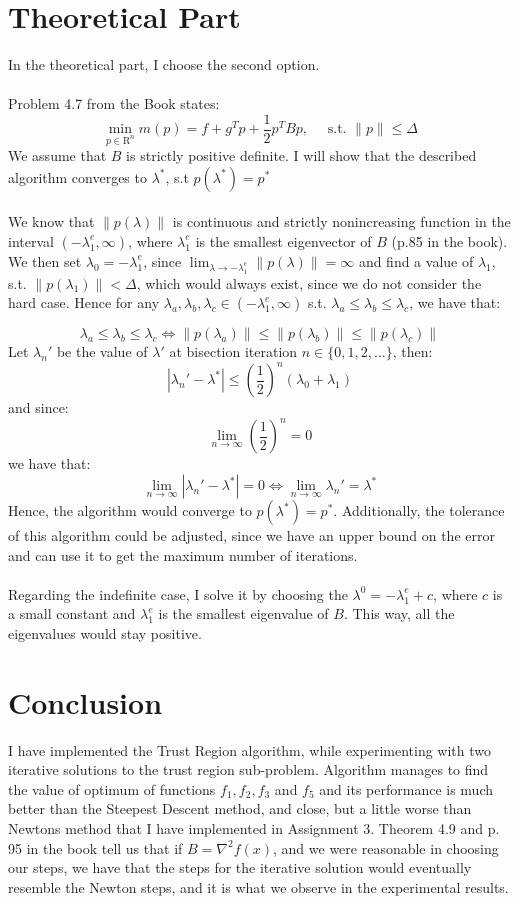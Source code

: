 \documentclass[a4paper]{article}
\begin{document}
\section{Theoretical Part}
\label{sec:theory}
In the theoretical part, I choose the second option. \\\\
Problem 4.7 from the Book states:
\[
\min _{p \in \mathrm{R}^{n}} m(p)=f+g^{T} p+\frac{1}{2} p^{T} B p, \quad \text { s.t. }\|p\| \leq \Delta
\]
We assume that $B$ is strictly positive definite. I
will show that the described algorithm converges to $\lambda^*$, s.t
$p(\lambda^*) = p^*$\\\\
We know that $\| p(\lambda) \|$ is continuous and
strictly nonincreasing function in the interval $(-\lambda^e_1, \infty)$, where
$\lambda_1^e$ is the smallest eigenvector of $B$
(p.85 in the book). We then set $\lambda_0 = -\lambda^e_1$, since
$\lim_{\lambda \to -\lambda^e_1} \| p(\lambda) \| = \infty$
and find a value of $\lambda_1$, s.t. $\| p(\lambda_1) \| < \Delta$, which would
always exist, since we do not consider the hard case.
Hence for any $\lambda_a, \lambda_b, \lambda_c \in (-\lambda^e_1, \infty)$ s.t.
$\lambda_a \leq \lambda_b \leq \lambda_c$, we have that:

\[
\lambda_a \leq \lambda_b \leq \lambda_c \Leftrightarrow
\|p(\lambda_a)\| \leq \|p(\lambda_b)\| \leq \|p(\lambda_c)\| 
\]
Let $\lambda_n'$ be the value of $\lambda'$ at bisection iteration
$n \in \{0,1,2,...\}$, then:
\[
|\lambda_n' - \lambda^*| \leq
\left(\frac{1}{2}\right)^n (\lambda_0 + \lambda_1)
\]
and since:
\[
\lim_{n \to \infty} \left(\frac{1}{2}\right)^n = 0
\]
we have that:
\[
\lim_{n \to \infty} | \lambda_n' - \lambda^*| = 0 \Leftrightarrow
\lim_{n \to \infty} \lambda_n' = \lambda^*
\]
Hence, the algorithm would converge to $p(\lambda^*) = p^*$. Additionally, the
tolerance of this algorithm could be adjusted, since we have an
upper bound on the error and can use it to get the maximum number of iterations.\\\\
Regarding the indefinite case, I solve it by choosing the
$\lambda^{0}= -\lambda_1^e + c$, where $c$ is a small
constant and $\lambda_1^e$ is the smallest eigenvalue of $B$. This way, all the
eigenvalues would stay positive.

\section{Conclusion}
I have implemented the Trust Region algorithm, while experimenting with two
iterative solutions to the trust region sub-problem.
Algorithm manages to find the value of optimum of functions $f_1, f_2, f_3$ and
$f_5$ and its performance is much better than the Steepest Descent method, and
close, but a little worse than Newtons method that I have implemented in Assignment 3.
Theorem 4.9 and p. 95 in the book tell us that if
$B = \nabla^2 f(x)$, and we were reasonable in choosing our steps, we have that
the steps for the iterative solution would eventually resemble the Newton steps,
and it is what we observe in the experimental results.
\end{document}
